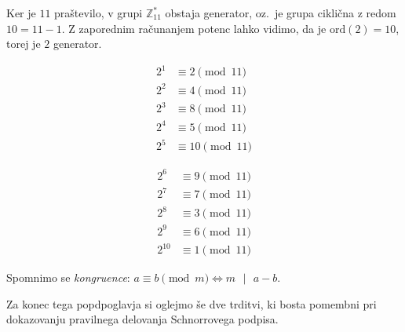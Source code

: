\documentclass[isrm2, tisk]{fmfdelo}
\newcommand{\Z}{\mathbb Z}
\begin{document}
\begin{primer}[Grupa $\Z_{11}^*$]
\label{primer:Z11}
Ker je $11$ praštevilo, v grupi $\Z_{11}^*$ obstaja generator, oz.\ je grupa ciklična z redom $10 = 
11 - 1$. Z zaporednim računanjem potenc lahko vidimo, da je $\text{ord}(2) = 10$, torej je $2$ 
generator.

\begin{minipage}{0.45\textwidth}
    \begin{align*}
        2^1 &\equiv 2 \pmod{11} \\
        2^2 &\equiv 4 \pmod{11} \\
        2^3 &\equiv 8 \pmod{11} \\
        2^4 &\equiv 5 \pmod{11} \\
        2^5 &\equiv 10 \pmod{11} 
    \end{align*}
\end{minipage}
\begin{minipage}{0.45\textwidth}
    \begin{align*}
        2^6 &\equiv 9 \pmod{11} \\
        2^7 &\equiv 7 \pmod{11} \\
        2^8 &\equiv 3 \pmod{11} \\
        2^9 &\equiv 6 \pmod{11} \\
        2^{10} &\equiv 1 \pmod{11} 
    \end{align*}
\end{minipage}

\end{primer}

\begin{opomba}
    Spomnimo se \textit{kongruence}: $a \equiv b \pmod m \iff m \text{ }|\text{ } a - b$.
\end{opomba}

Za konec tega popdpoglavja si oglejmo še dve trditvi, ki bosta pomembni pri dokazovanju pravilnega
delovanja Schnorrovega podpisa.
\end{document}
